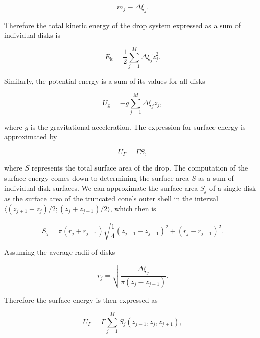     \begin{equation}
        m_j \equiv \Delta \xi_j.
    \end{equation}

    Therefore the total kinetic energy of the drop system expressed as a sum of individual disks is 

    \begin{equation}
        E_{\mathrm{k}} = \frac{1}{2} \sum^M_{j=1} \Delta \xi_j \dot{z}_j^2.
    \end{equation}

    Similarly, the potential energy is a sum of its values for all disks

    \begin{equation}
        U_{\mathrm{g}} = -g \sum^M_{j=1} \Delta \xi_j z_j,
    \end{equation}

    where $g$ is the gravitational acceleration. The expression for surface energy is approximated by 

    \begin{equation}
        U_{\Gamma} = \Gamma S,
    \end{equation}

    where $S$ represents the total surface area of the drop. The computation of the surface energy comes down to determining the surface area $S$ as a sum of individual disk surfaces. We can approximate the surface area $S_j$ of a single disk as the surface area of the truncated cone's outer shell in the interval $\langle (z_{j+1} + z_j) / 2; (z_j + z_{j-1}) / 2 \rangle$, which then is

    \begin{equation}
        S_j = \pi (r_j + r_{j+1}) \sqrt{\frac{1}{4} (z_{j+1} - z_{j-1})^2 + (r_j - r_{j+1})^2}.
    \end{equation}

    Assuming the average radii of disks
    
    \begin{equation}
        r_j = \sqrt{\frac{\Delta \xi_j}{\pi (z_j - z_{j-1})}}.
    \end{equation}

    Therefore the surface energy is then expressed as

    \begin{equation}
        U_{\Gamma} = \Gamma \sum_{j=1}^M S_j(z_{j-1}, z_j, z_{j+1}),
    \end{equation}

